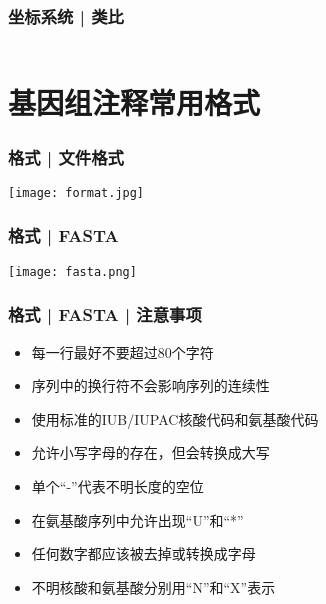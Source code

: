 \begin{frame}
  \frametitle{坐标系统 | 类比}
  \begin{columns}
  \end{columns}
\end{frame}

\section{基因组注释常用格式}
\begin{frame}
  \frametitle{格式 | 文件格式}
    \begin{center}
      \texttt{[image: format.jpg]}
    \end{center}
\end{frame}

\begin{frame}
  \frametitle{格式 | FASTA}
    \begin{center}
      \texttt{[image: fasta.png]}
    \end{center}
\end{frame}

\begin{frame}
  \frametitle{格式 | FASTA | 注意事项}
  \begin{itemize}
    \item 每一行最好不要超过80个字符
    \item 序列中的换行符不会影响序列的连续性
    \item 使用标准的IUB/IUPAC核酸代码和氨基酸代码
    \item 允许小写字母的存在，但会转换成大写
    \item 单个“-”代表不明长度的空位
    \item 在氨基酸序列中允许出现“U”和“*”
    \item 任何数字都应该被去掉或转换成字母
    \item 不明核酸和氨基酸分别用“N”和“X”表示
  \end{itemize}
\end{frame}

